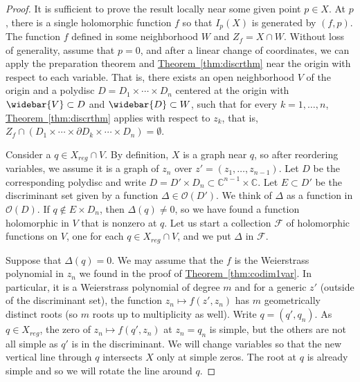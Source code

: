 \documentclass[12pt,openany]{book}
\newcommand{\C}{{\mathbb{C}}}
\newcommand{\sF}{{\mathscr{F}}}
\newcommand{\sO}{{\mathscr{O}}}
\theoremstyle{plain}
\theoremstyle{remark}
\theoremstyle{definition}
\theoremstyle{exercise}
\theoremstyle{example}
\newcommand{\thmref}[1]{\hyperref[#1]{Theorem~\ref*{#1}}}
\begin{document}
\begin{proof}
It is sufficient to prove the result locally near some given point $p \in X$.
At $p$, there is a single holomorphic function $f$
so that $I_p(X)$ is generated by $(f,p)$.
The function $f$ defined in some neighborhood $W$ and
$Z_f = X \cap W$.
Without loss of generality, assume that $p=0$,
and after a linear change of coordinates, we can apply
the preparation theorem and \thmref{thm:discrthm}
near the origin with respect to each variable.
That is, there exists an open neighborhood $V$ of the origin and
a polydisc $D=D_1 \times \cdots
\times D_n$ centered at the origin with
$\widebar{V} \subset D$ and $\widebar{D} \subset W$, such that
for every $k=1,\ldots,n$,
\thmref{thm:discrthm} applies with respect to $z_k$,
that is,
$Z_f \cap
(D_1 \times \cdots \times \partial D_k \times \cdots \times D_n)
= \emptyset$.


Consider a $q \in X_{\mathit{reg}} \cap V$.  By definition, $X$ is a graph
near $q$, so after reordering variables,
we assume it is a graph of $z_n$
over $z'=(z_1,\ldots,z_{n-1})$.
Let $D$ be the corresponding polydisc and
write $D = D' \times D_n \subset \C^{n-1} \times \C$.  Let $E \subset D'$
be the discriminant set given by a function $\Delta \in \sO(D')$.
We think of $\Delta$ as a function in $\sO(D)$.
If $q \notin E \times D_n$, then $\Delta(q) \neq 0$, so we have
found a function holomorphic in $V$ that is nonzero at $q$.
Let us start a collection $\sF$ of holomorphic functions on $V$,
one for each $q \in X_{\mathit{reg}} \cap V$,
and we put $\Delta$ in $\sF$.

Suppose that $\Delta(q) = 0$.
We may assume that the $f$ is the Weierstrass polynomial
in $z_n$ we found in the proof of \thmref{thm:codim1var}.  In particular, it is
a Weierstrass polynomial of degree $m$ and
for a generic $z'$ (outside of the discriminant set),
the function $z_n \mapsto f(z',z_n)$ has $m$ geometrically distinct roots
(so $m$ roots up to multiplicity as well).
Write $q = (q',q_n)$.
As $q \in X_{\mathit{reg}}$,
the zero of $z_n \mapsto f(q',z_n)$ at $z_n=q_n$ is simple, but the others
are not all simple as $q'$ is in the discriminant.
We will change variables so that the new vertical line through $q$
intersects $X$ only at simple zeros.  The root at $q$
is already simple and so we will rotate the line around $q$.


\end{proof}
\end{document}
